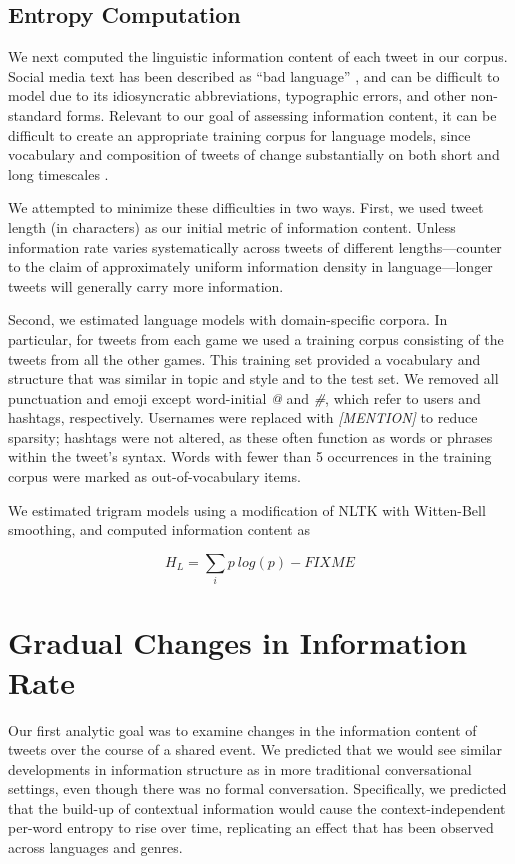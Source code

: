 \documentclass[11pt,letterpaper]{article}
\begin{document}
\subsection{Entropy Computation}

We next computed the linguistic information content of each tweet in our corpus. Social media text has been described as ``bad language'' \cite{eisenstein2013}, and can be difficult to model due to its idiosyncratic abbreviations, typographic errors, and other non-standard forms. Relevant to our goal of assessing information content, it can be difficult to create an appropriate training corpus for language models, since vocabulary and composition of tweets of change substantially on both short and long timescales \cite{eisenstein2013}.

We attempted to minimize these difficulties in two ways.  First, we used tweet length (in characters) as our initial metric of information content. Unless information rate varies systematically across tweets of different lengths---counter to the claim of approximately uniform information density in language\cite{genzel2002,levy2007}---longer tweets will generally carry more information.

Second, we estimated language models with domain-specific corpora. In particular, for tweets from each game we used a training corpus consisting of the tweets from all the other games. This training set provided a vocabulary and structure that was similar in topic and style and to the test set.  We removed all punctuation and emoji except word-initial {\it @} and {\it \#}, which refer to users and hashtags, respectively.  Usernames were replaced with {\it [MENTION]} to reduce sparsity; hashtags were not altered, as these often function as words or phrases within the tweet's syntax.  Words with fewer than 5 occurrences in the training corpus were marked as out-of-vocabulary items.

We estimated trigram models using a modification of NLTK \cite{nltk} with Witten-Bell smoothing, and computed information content as

\begin{equation}
H_L = \sum_i{p ~ log(p)} - FIXME
\end{equation}

\section{Gradual Changes in Information Rate}

Our first analytic goal was to examine changes in the information content of tweets over the course of a shared event.  We predicted that we would see similar developments in information structure as in more traditional conversational settings, even though there was no formal conversation.  Specifically, we predicted that the build-up of contextual information would cause the context-independent per-word entropy to rise over time, replicating an effect that has been observed across languages and genres\cite{genzel2002,genzel2003,qian2012}.
\end{document}

